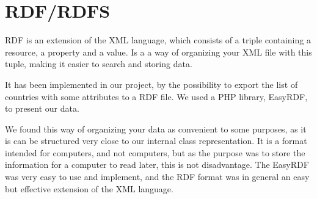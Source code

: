 \section{RDF/RDFS}
RDF is an extension of the XML language, which consists of a triple containing a resource, a property and a value.
Is a a way of organizing your XML file with this tuple, making it easier to search and storing data.

It has been implemented in our project, by the possibility to export the list of countries with some attributes to a RDF file. We used a PHP library, EasyRDF, to present our data.

We found this way of organizing your data as convenient to some purposes, as it is can be structured very close to our internal class representation. It is a format intended for computers, and not computers, but as the purpose was to store the information for a computer to read later, this is not disadvantage.
The EasyRDF was very easy to use and implement, and the RDF format was in general an easy but effective extension of the XML language.